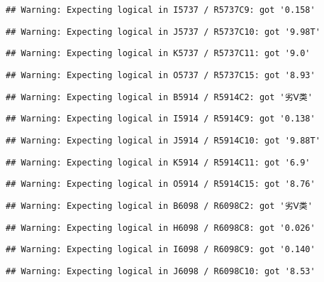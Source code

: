\documentclass[
]{article}
\begin{document}
\begin{verbatim}
## Warning: Expecting logical in I5737 / R5737C9: got '0.158'
\end{verbatim}

\begin{verbatim}
## Warning: Expecting logical in J5737 / R5737C10: got '9.98T'
\end{verbatim}

\begin{verbatim}
## Warning: Expecting logical in K5737 / R5737C11: got '9.0'
\end{verbatim}

\begin{verbatim}
## Warning: Expecting logical in O5737 / R5737C15: got '8.93'
\end{verbatim}

\begin{verbatim}
## Warning: Expecting logical in B5914 / R5914C2: got '劣Ⅴ类'
\end{verbatim}

\begin{verbatim}
## Warning: Expecting logical in I5914 / R5914C9: got '0.138'
\end{verbatim}

\begin{verbatim}
## Warning: Expecting logical in J5914 / R5914C10: got '9.88T'
\end{verbatim}

\begin{verbatim}
## Warning: Expecting logical in K5914 / R5914C11: got '6.9'
\end{verbatim}

\begin{verbatim}
## Warning: Expecting logical in O5914 / R5914C15: got '8.76'
\end{verbatim}

\begin{verbatim}
## Warning: Expecting logical in B6098 / R6098C2: got '劣Ⅴ类'
\end{verbatim}

\begin{verbatim}
## Warning: Expecting logical in H6098 / R6098C8: got '0.026'
\end{verbatim}

\begin{verbatim}
## Warning: Expecting logical in I6098 / R6098C9: got '0.140'
\end{verbatim}

\begin{verbatim}
## Warning: Expecting logical in J6098 / R6098C10: got '8.53'
\end{verbatim}
\end{document}
